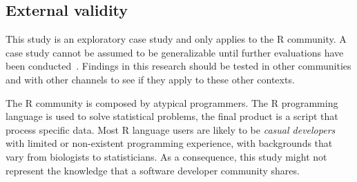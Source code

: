 

\subsection{External validity}

    This study is an exploratory case study and only applies to the R community.
    A case study cannot be assumed to be generalizable until further evaluations have been conducted~\cite{Yin2009}.
    Findings in this research should be tested in other communities and with other channels to see if they apply to these other contexts.

    The R community is composed by atypical programmers.
    The R programming language is used to solve statistical problems, the final product is a script that process specific data.
    Most R language users are likely to be \textit{casual developers} with limited or non-existent programming experience, with backgrounds that vary from biologists to statisticians.
    As a consequence, this study might not represent the knowledge that a software developer community shares.



